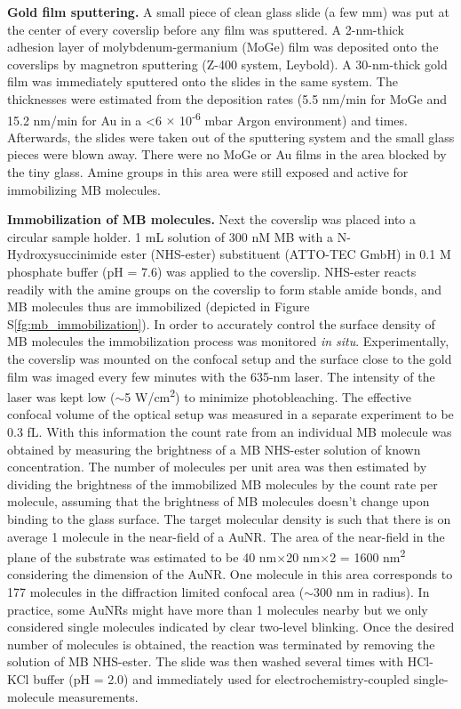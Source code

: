 \documentclass[11pt,a4paper,onecolumn]{article}
\begin{document}
\textbf{Gold film sputtering.} A small piece of clean glass slide (a few mm) was put at the center of every coverslip before any film was sputtered. A 2-nm-thick adhesion layer of molybdenum-germanium (MoGe) film was deposited onto the coverslips by magnetron sputtering (Z-400 system, Leybold). A 30-nm-thick gold film was immediately sputtered onto the slides in the same system. The thicknesses were estimated from the deposition rates (5.5 nm/min for MoGe and 15.2 nm/min for Au in a <6 \(\times\) 10\textsuperscript{-6} mbar Argon environment) and times. Afterwards, the slides were taken out of the sputtering system and the small glass pieces were blown away. There were no MoGe or Au films in the area blocked by the tiny glass. Amine groups in this area were still exposed and active for immobilizing MB molecules. 

\textbf{Immobilization of MB molecules.} Next the coverslip was placed into a circular sample holder. 1 mL solution of 300 nM MB with a N-Hydroxysuccinimide ester (NHS-ester) substituent (ATTO-TEC GmbH) in 0.1 M phosphate buffer (pH = 7.6) was applied to the coverslip. NHS-ester reacts readily with the amine groups on the coverslip to form stable amide bonds, and MB molecules thus are immobilized (depicted in Figure S\ref{fg:mb_immobilization}). In order to accurately control the surface density of MB molecules the immobilization process was monitored \textit{in situ}. Experimentally, the coverslip was mounted on the confocal setup and the surface close to the gold film was imaged every few minutes with the 635-nm laser. The intensity of the laser was kept low (\(\sim\)5 W/cm\textsuperscript{2}) to minimize photobleaching. %
The effective confocal volume of the optical setup was measured in a separate experiment to be 0.3 fL. %
With this information the count rate from an individual MB molecule was obtained by measuring the brightness of a MB NHS-ester solution of known concentration. The number of molecules per unit area was then estimated by dividing the brightness of the immobilized MB molecules by the count rate per molecule, assuming that the brightness of MB molecules doesn't change upon binding to the glass surface. The target molecular density is such that there is on average 1 molecule in the near-field of a AuNR. The area of the near-field in the plane of the substrate was estimated to be 40 nm\(\times\)20 nm\(\times\)2 = 1600 nm\textsuperscript{2} considering the dimension of the AuNR. One molecule in this area corresponds to 177 molecules in the diffraction limited confocal area (\(\sim\)300 nm in radius). In practice, some AuNRs might have more than 1 molecules nearby but we only considered single molecules indicated by clear two-level blinking. Once the desired number of molecules is obtained, the reaction was terminated by removing the solution of MB NHS-ester. The slide was then washed several times with HCl-KCl buffer (pH = 2.0) and immediately used for electrochemistry-coupled single-molecule measurements.
\end{document}
